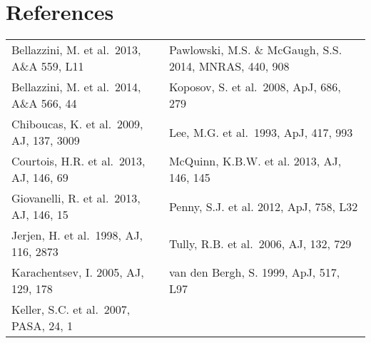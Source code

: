 


\section*{References}

\begin{table}[h]
\begin{tabular}{ll}
Bellazzini, M. et al.\  2013, A\&A 559, L11 & Pawlowski, M.S. \&  McGaugh, S.S. 2014, MNRAS, 440, 908\\
Bellazzini, M. et al.\  2014, A\&A 566, 44 & Koposov, S. et al.\ 2008, ApJ, 686, 279\\
Chiboucas, K. et al.\  2009, AJ, 137, 3009 & Lee, M.G. et al.\ 1993, ApJ, 417, 993\\
Courtois, H.R. et al.\ 2013, AJ, 146, 69 &  McQuinn, K.B.W. et al. 2013, AJ, 146, 145\\
Giovanelli, R. et al.\ 2013, AJ, 146, 15 & Penny, S.J. et al. 2012, ApJ, 758, L32\\
Jerjen, H. et al.\ 1998, AJ, 116, 2873  &  Tully, R.B. et al.\ 2006, AJ, 132, 729\\
Karachentsev, I. 2005, AJ, 129, 178 &van den Bergh, S. 1999, ApJ, 517, L97\\
Keller, S.C. et al.\ 2007, PASA, 24, 1\\
\end{tabular}
\end{table}



